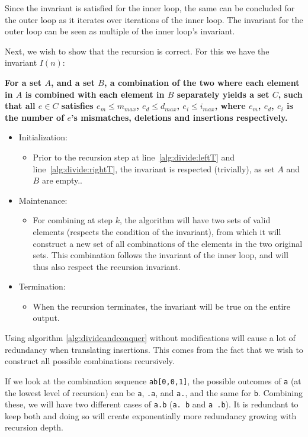 \documentclass[12pt]{article}
\theoremstyle{definition}
\newcounter{subsubsubsection}[subsubsection]
\begin{document}
Since the invariant is satisfied for the inner loop, the same can be concluded for the outer loop as it iterates over iterations of the inner loop. The invariant for the outer loop can be seen as multiple of the inner loop's invariant.

Next, we wish to show that the recursion is correct. For this we have the invariant $I(n)$:

\textbf{For a set $A$, and a set $B$, a combination of the two where each element in $A$ is combined with each element in $B$ separately yields a set $C$, such that all $e \in C$ satisfies $e_m \leq m_{max}$, $e_d \leq d_{max}$, $e_i \leq i_{max}$, where $e_m$, $e_d$, $e_i$ is the number of $e$'s mismatches, deletions and insertions respectively.}


\begin{itemize}
\item Initialization:
\begin{itemize}
	\item[] Prior to the recursion step at line~\ref{alg:divide:leftT} and line~\ref{alg:divide:rightT}, the invariant is respected (trivially), as set $A$ and $B$ are empty..
\end{itemize}

\item Maintenance:
\begin{itemize}
	\item[] For combining at step $k$, the algorithm will have two sets of valid elements (respects the condition of the invariant), from which it will construct a new set of all combinations of the elements in the two original sets. This combination follows the invariant of the inner loop, and will thus also respect the recursion invariant.
\end{itemize}

\item Termination:
\begin{itemize}
	\item[] When the recursion terminates, the invariant will be true on the entire output.
\end{itemize}
\end{itemize}



Using algorithm \ref{alg:divideandconquer} without modifications will cause a lot of redundancy when translating insertions. This comes from the fact that we wish to construct all possible combinations recursively.

If we look at the combination sequence \texttt{ab[0,0,1]}, the possible outcomes of \texttt{a} (at the lowest level of recursion) can be \texttt{a}, \texttt{.a}, and \texttt{a.}, and the same for \texttt{b}. Combining these, we will have two different cases of \texttt{a.b} (\texttt{a. b} and \texttt{a .b}). It is redundant to keep both and doing so will create exponentially more redundancy growing with recursion depth.
\end{document}

